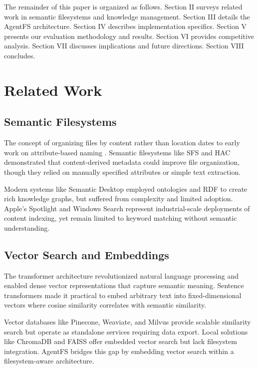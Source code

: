 \documentclass[conference]{IEEEtran}
\begin{document}
The remainder of this paper is organized as follows. Section II surveys related work in semantic filesystems and knowledge management. Section III details the AgentFS architecture. Section IV describes implementation specifics. Section V presents our evaluation methodology and results. Section VI provides competitive analysis. Section VII discusses implications and future directions. Section VIII concludes.

\section{Related Work}

\subsection{Semantic Filesystems}

The concept of organizing files by content rather than location dates to early work on attribute-based naming \cite{gifford1991semantic}. Semantic filesystems like SFS \cite{gopal1999sfs} and HAC \cite{soules2003metadata} demonstrated that content-derived metadata could improve file organization, though they relied on manually specified attributes or simple text extraction.

Modern systems like Semantic Desktop \cite{sauermann2006semantic} employed ontologies and RDF to create rich knowledge graphs, but suffered from complexity and limited adoption. Apple's Spotlight and Windows Search represent industrial-scale deployments of content indexing, yet remain limited to keyword matching without semantic understanding.

\subsection{Vector Search and Embeddings}

The transformer architecture \cite{vaswani2017attention} revolutionized natural language processing and enabled dense vector representations that capture semantic meaning. Sentence transformers \cite{reimers2019sentence} made it practical to embed arbitrary text into fixed-dimensional vectors where cosine similarity correlates with semantic similarity.

Vector databases like Pinecone, Weaviate, and Milvus provide scalable similarity search but operate as standalone services requiring data export. Local solutions like ChromaDB and FAISS offer embedded vector search but lack filesystem integration. AgentFS bridges this gap by embedding vector search within a filesystem-aware architecture.
\end{document}
